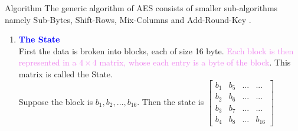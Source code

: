 \documentclass{beamer}
\begin{document}
\begin{frame}[allowframebreaks]{Algorithm}
  The generic algorithm of AES consists of smaller sub-algorithms namely \textcolor{green!50!black}{Sub-Bytes, Shift-Rows, Mix-Columns and Add-Round-Key} \cite{aes}.
\vspace{2mm}
  \begin{enumerate}
  \item \textbf{\textcolor{blue}{The State}}\\
    First the data is broken into blocks, each of size 16 byte. \textcolor{violet}{Each block is then represented in a \(4 \times 4\) matrix, whose each entry is a byte of the block}. This matrix is called the State.\\
    Suppose the block is \(b_1, b_2,...,b_{16}\). Then the state is
    \(\left[\begin{smallmatrix}
  b_1 & b_5 &... & ...\\
  b_2 & b_6 &... & ...\\
  b_3 & b_7 &... & ...\\
  b_4 & b_8 &... & b_{16}
\end{smallmatrix}\right]\)
\vspace{2mm}


\end{enumerate}
\end{frame}
\end{document}
